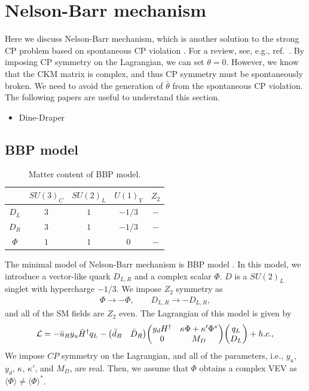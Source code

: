 \documentclass[11pt,a4paper]{article}
\begin{document}
\section{Nelson-Barr mechanism}\label{sec:nelson barr}
Here we discuss Nelson-Barr mechanism, which is another solution to the strong CP problem based on spontaneous CP violation \cite{Nelson:1983zb, Barr:1984qx, Barr:1984fh}. For a review, see, e.g., ref.~\cite{Dine:2015jga}.
By imposing CP symmetry on the Lagrangian, we can set $\theta=0$. However, we know that the CKM matrix is complex, and thus CP symmetry must be spontaneously broken.
We need to avoid the generation of $\bar\theta$ from the spontaneous CP violation.
The following papers are useful to understand this section.
\begin{itemize}
\item Dine-Draper \cite{Dine:2015jga}
\end{itemize}


\subsection{BBP model}
\begin{table}[h]
\centering
\begin{tabular}{c|cccc}
& $SU(3)_C$ & $SU(2)_L$ & $U(1)_Y$ & $Z_2$ \\\hline
$D_L$ & $3$ & $1$ & $-1/3$ & $-$ \\
$D_R$ & $3$ & $1$ & $-1/3$ & $-$ \\
$\Phi$ & $1$ & $1$ & $0$ & $-$ \\
\end{tabular}
\caption{Matter content of BBP model.}\label{tab:BBP}
\end{table}
%
The minimal model of Nelson-Barr mechanism is BBP model \cite{Bento:1991ez}. In this model,
we introduce a vector-like quark $D_{L,R}$ and a complex scalar $\Phi$. $D$ is a $SU(2)_L$ singlet with hypercharge $-1/3$. We impose $Z_2$ symmetry as
\begin{align}
    \Phi \to -\Phi, \qquad D_{L,R} \to -D_{L,R},
\end{align}
and all of the SM fields are $Z_2$ even. The Lagrangian of this model is given by
\begin{align}
    \mathcal{L} =
    -\bar u_R y_u \tilde H^\dagger q_L
    -\mqty(\bar{d}_{R} & \bar{D}_{R}
    )\mqty(y_{d} H^\dagger & \kappa \Phi + \kappa' \Phi^* \\  0 & M_D  )\mqty(q_{L}\\ D_{L}) + h.c., \label{eq:Lagrangian typeD}
\end{align}
We impose $CP$ symmetry on the Lagrangian, and all of the parameters, i.e., $y_u$, $y_d$, $\kappa$, $\kappa'$, and $M_D$, are real.
Then, we assume that $\Phi$ obtains a complex VEV as $\langle \Phi \rangle \neq \langle \Phi \rangle^*$.
\end{document}
